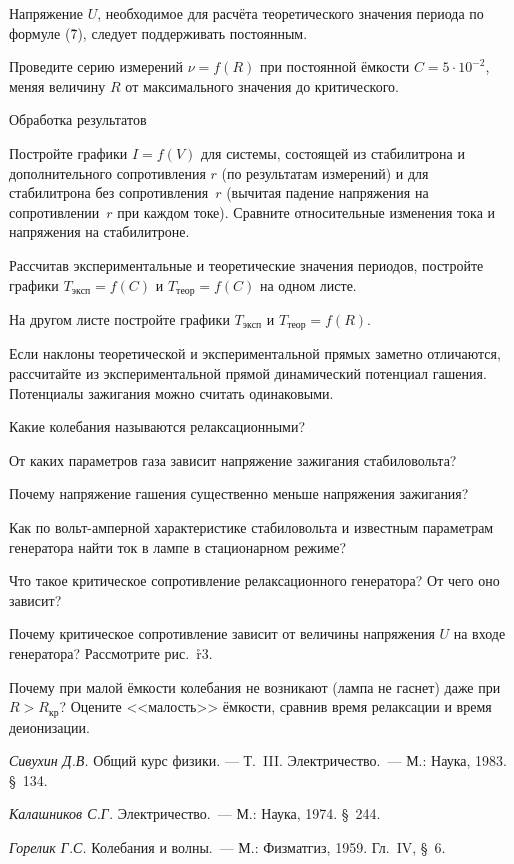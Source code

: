 Напряжение $U$, необходимое для расчёта теоретического значения периода по формуле (\r7), следует поддерживать
постоянным.

\n Проведите серию измерений $\nu=f(R)$ при постоянной ёмкости $C=5\cdot10^{-2}$, меняя величину $R$ от максимального
значения до критического.

\znr Обработка результатов

\n Постройте графики $I=f(V)$ для системы, состоящей из стабилитрона и дополнительного сопротивления $r$ (по результатам
измерений) и для стабилитрона без сопротивления~$r$ (вычитая падение напряжения на сопротивлении~$r$ при каждом токе).
Сравните относительные изменения тока и напряжения на стабилитроне.

\n Рассчитав экспериментальные и теоретические значения периодов, постройте графики $T_{эксп}=f(C)$ и $T_{теор}=f(C)$ на
одном листе.

На другом листе постройте графики $T_{эксп}$ и $T_{теор}=f(R)$.

\n Если наклоны теоретической и экспериментальной прямых заметно отличаются, рассчитайте из экспериментальной прямой
динамический потенциал гашения. Потенциалы зажигания можно считать одинаковыми.

{\small

\kv

\n Какие колебания называются релаксационными?

\n От каких параметров газа зависит напряжение зажигания стабиловольта?

\n Почему напряжение гашения существенно меньше напряжения зажигания?


\n Как по вольт-амперной характеристике стабиловольта и известным параметрам генератора найти ток в лампе в стационарном
режиме?

\n Что такое критическое сопротивление релаксационного генератора? От чего оно зависит?

\n Почему критическое сопротивление зависит от величины напряжения $U$ на входе генератора? Рассмотрите рис.~\r{r3}.

\n Почему при малой ёмкости колебания не возникают (лампа не гаснет) даже при $R>R_{кр}$? Оцените <<малость>> ёмкости,
сравнив время релаксации и время деионизации.

\lit

\n \emph{Сивухин Д.В.} Общий курс физики. --- Т.~III. Электричество.~--- М.: Наука, 1983. \S~134.

\n \emph{Калашников С.Г.} Электричество.~--- М.: Наука, 1974. \S~244.

\n \emph{Горелик Г.С.} Колебания и волны.~--- М.: Физматгиз, 1959. Гл.~IV, \S~6.

}
